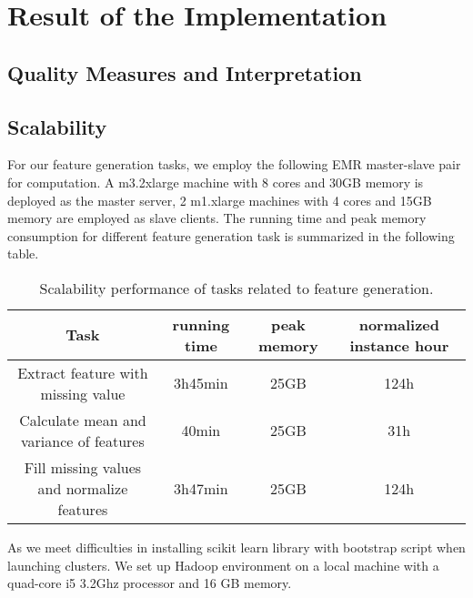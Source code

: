 \section{Result of the Implementation}
\subsection{Quality Measures and Interpretation}
\subsection{Scalability}
For our feature generation tasks, we employ the following EMR master-slave pair for computation. A m3.2xlarge machine with 8 cores and 30GB memory is deployed as the master server, 2 m1.xlarge machines with 4 cores and	15GB memory are employed as slave clients. The running time and peak memory consumption for different feature generation task is summarized in the following table.

\begin{table}[H]
    \begin{tabular}{| c | c | c | c |}
    \hline
    Task & running time & peak memory & normalized instance hour \\
    \hline
    \hline
    Extract feature with missing value & 3h45min & 25GB & 124h\\
    \hline
    Calculate mean and variance of features & 40min & 25GB & 31h\\
    \hline
    Fill missing values and normalize features & 3h47min & 25GB & 124h\\
    \hline
    \end{tabular}
    \caption{Scalability performance of tasks related to feature generation.}
    \label{tbl:PerfTable}
\end{table}

As we meet difficulties in installing scikit learn library with bootstrap script when launching clusters. We set up Hadoop environment on a local machine with a quad-core i5 3.2Ghz processor and 16 GB memory. 
